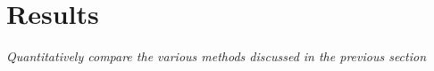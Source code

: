 
\chapter{Results}

\textit{Quantitatively compare the various methods discussed in the previous
section}
